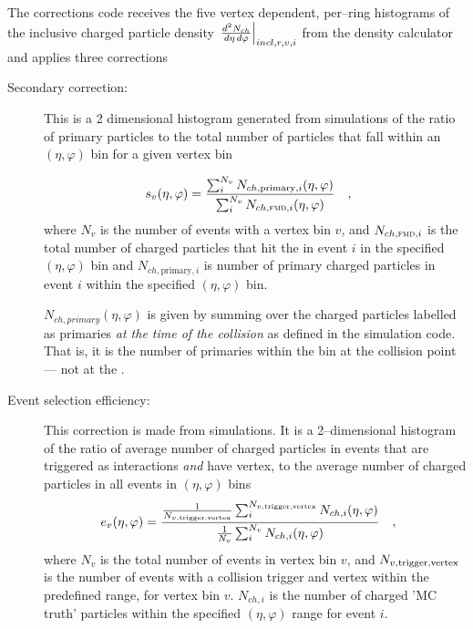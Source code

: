 \documentclass[11pt]{article}
\newcommand{\AbbrName}[1]{{\ifmmode\text{\scshape #1}\else{\scshape #1}\fi}}
\newcommand{\FMD}[1][]{\AbbrName{fmd\ifx|#1|\else#1\fi}}
\newcommand{\dndetadphi}[1][]{{\ensuremath%
    \ifx|#1|\else\left.\fi%
    \frac{d^2N_{ch}}{d\eta\,d\varphi}%
    \ifx|#1|\else\right|_{#1}\fi%
}}
\newcommand{\Nsel}{{\ensuremath N_{v,\text{trigger,vertex}}}}
\begin{document}
The corrections code receives the five vertex dependent,
per--ring histograms of the inclusive charged particle density
$\dndetadphi[incl,r,v,i]$ from the density calculator and applies
three corrections 
\begin{description}
\item[Secondary correction:] This is a 2 dimensional histogram
  generated from simulations of the ratio of primary particles to the
  total number of particles that fall within an $(\eta,\varphi)$ bin
  for a given vertex bin

  \begin{align}
    s_v(\eta,\varphi) &=
    \frac{\sum_i^{N_{v}}N_{ch,\text{primary},i}(\eta,\varphi)}{
      \sum_i^{N_{v}}N_{ch,\text{\FMD{}},i}(\eta,\varphi)}\quad,
  \end{align}
  where $N_{v}$ is the number of events with a vertex bin $v$, and
  $N_{ch,\FMD{},i}$ is the total number of charged particles that hit
  the \FMD{} in event $i$ in the specified $(\eta,\varphi)$ bin and
  $N_{ch,\text{primary},i}$ is number of primary charged particles in
  event $i$ within the specified $(\eta,\varphi)$ bin.

  $N_{ch,primary}(\eta,\varphi)$ is given by summing over the charged
  particles labelled as primaries \emph{at the time of the collision}
  as defined in the simulation code.  That is, it is the number of
  primaries within the bin at the collision point --- not at the
  \FMD{}.  
\item[Event selection efficiency:] 
  This correction is made from simulations.  It is a 2--dimensional
  histogram of the ratio of average number of charged particles in
  events that are triggered as interactions \emph{and} have vertex, to
  the average number of charged particles in all events in
  $(\eta,\varphi)$ bins
  \begin{align}
    \label{eq:event_sel_eff}
    e_{v}(\eta,\varphi) &= 
    \frac{\frac{1}{\Nsel{}}
      \sum_{i}^{\Nsel{}} N_{ch,i}(\eta,\varphi)}{
      \frac{1}{N_{v}}
      \sum_{i}^{N_{v}} N_{ch,i}(\eta,\varphi)}\quad,
  \end{align}
  where $N_{v}$ is the total number of events in vertex bin $v$, and
  $\Nsel{}$ is the number of events with a collision trigger and
  vertex within the predefined range, for vertex bin $v$.  $N_{ch,i}$
  is the number of charged 'MC truth' particles within the specified
  $(\eta,\varphi)$ range for event $i$.


\end{description}
\end{document}
